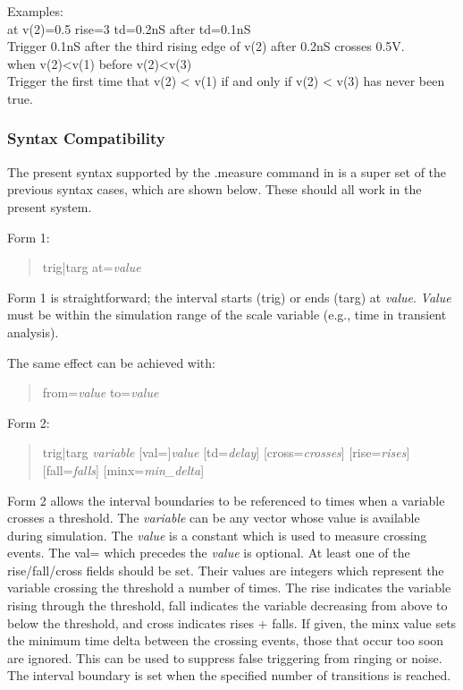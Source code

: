 Examples:\\
{\vt at v(2)=0.5 rise=3 td=0.2nS after td=0.1nS}\\
\hspace*{1em}Trigger 0.1nS after the third rising edge of v(2) after
0.2nS crosses 0.5V.\\
{\vt when v(2)<v(1) before v(2)<v(3)}\\
\hspace*{1em}Trigger the first time that {\vt v(2) < v(1)} if and only
if {\vt v(2) < v(3)} has never been true.

\subsubsection{Syntax Compatibility}

The present syntax supported by the {\vt .measure} command in
{\WRspice} is a super set of the previous syntax cases, which
    are shown below.  These should all work in the present system.

Form 1:
\begin{quote}\vt
    trig|targ at={\it value}
\end{quote}

Form 1 is straightforward; the interval starts ({\vt trig}) or ends
({\vt targ}) at {\it value}.  {\it Value} must be within the
simulation range of the scale variable (e.g., time in transient
analysis).

The same effect can be achieved with:
\begin{quote}\vt
    from={\it value} to={\it value}
\end{quote}

Form 2:
\begin{quote}\vt
    trig|targ {\it variable} [val=]{\it value}
        [td={\it delay}] [cross={\it crosses}]
        [rise={\it rises}] [fall={\it falls}] [minx={\it min\_delta}]
\end{quote}

Form 2 allows the interval boundaries to be referenced to times when a
variable crosses a threshold.  The {\it variable} can be any vector
whose value is available during simulation.  The {\it value} is a
constant which is used to measure crossing events.  The {\vt val=}
which precedes the {\it value} is optional.  At least one of the {\vt
rise/fall/cross} fields should be set.  Their values are integers
which represent the variable crossing the threshold a number of times. 
The {\vt rise} indicates the variable rising through the threshold,
{\vt fall} indicates the variable decreasing from above to below the
threshold, and {\vt cross} indicates {\vt rises + falls}.  If given,
the {\vt minx} value sets the minimum time delta between the crossing
events, those that occur too soon are ignored.  This can be used to
suppress false triggering from ringing or noise.  The interval
boundary is set when the specified number of transitions is reached.

